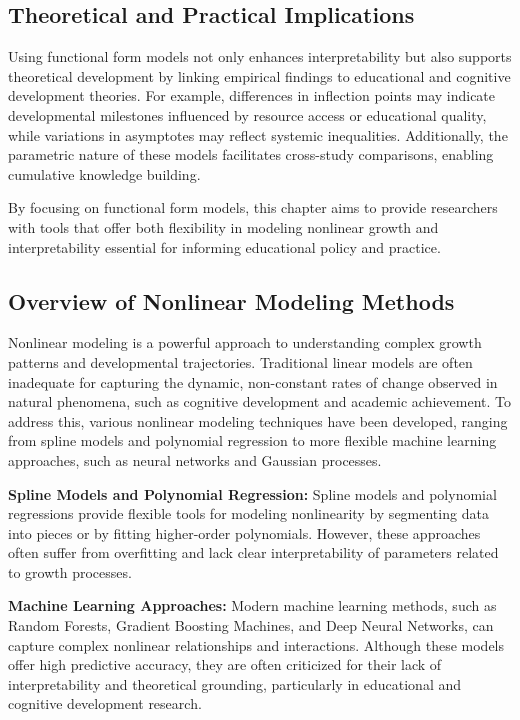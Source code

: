 \documentclass[
  letterpaper,
  DIV=11,
  numbers=noendperiod]{scrreprt}
\begin{document}
\subsection{Theoretical and Practical
Implications}\label{theoretical-and-practical-implications}

Using functional form models not only enhances interpretability but also
supports theoretical development by linking empirical findings to
educational and cognitive development theories. For example, differences
in inflection points may indicate developmental milestones influenced by
resource access or educational quality, while variations in asymptotes
may reflect systemic inequalities. Additionally, the parametric nature
of these models facilitates cross-study comparisons, enabling cumulative
knowledge building.

By focusing on functional form models, this chapter aims to provide
researchers with tools that offer both flexibility in modeling nonlinear
growth and interpretability essential for informing educational policy
and practice.

\subsection{Overview of Nonlinear Modeling
Methods}\label{overview-of-nonlinear-modeling-methods}

Nonlinear modeling is a powerful approach to understanding complex
growth patterns and developmental trajectories. Traditional linear
models are often inadequate for capturing the dynamic, non-constant
rates of change observed in natural phenomena, such as cognitive
development and academic achievement. To address this, various nonlinear
modeling techniques have been developed, ranging from spline models and
polynomial regression to more flexible machine learning approaches, such
as neural networks and Gaussian processes.

\textbf{Spline Models and Polynomial Regression:} Spline models and
polynomial regressions provide flexible tools for modeling nonlinearity
by segmenting data into pieces or by fitting higher-order polynomials.
However, these approaches often suffer from overfitting and lack clear
interpretability of parameters related to growth processes.

\textbf{Machine Learning Approaches:} Modern machine learning methods,
such as Random Forests, Gradient Boosting Machines, and Deep Neural
Networks, can capture complex nonlinear relationships and interactions.
Although these models offer high predictive accuracy, they are often
criticized for their lack of interpretability and theoretical grounding,
particularly in educational and cognitive development research.
\end{document}
